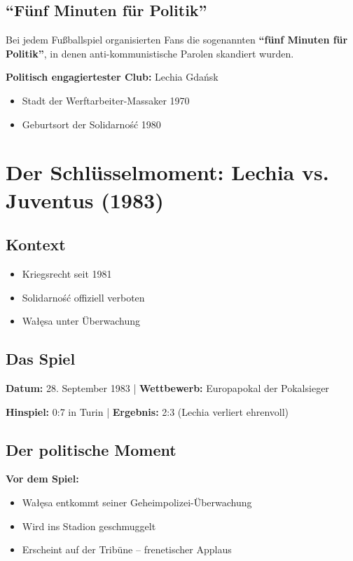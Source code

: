 \documentclass[11pt,a4paper]{book}
\newenvironment{filminfo}{%
  \begin{mdframed}[
    linecolor=darkgray,
    linewidth=1pt,
    backgroundcolor=gray!5,
    innertopmargin=10pt,
    innerbottommargin=10pt
  ]
}{%
  \end{mdframed}
}
\begin{document}
\subsection{``Fünf Minuten für Politik''}

Bei jedem Fußballspiel organisierten Fans die sogenannten \textbf{``fünf Minuten für Politik''}, in denen anti-kommunistische Parolen skandiert wurden.

\textbf{Politisch engagiertester Club:} Lechia Gdańsk
\begin{itemize}
    \item Stadt der Werftarbeiter-Massaker 1970
    \item Geburtsort der Solidarność 1980
\end{itemize}

\section{Der Schlüsselmoment: Lechia vs. Juventus (1983)}

\subsection{Kontext}

\begin{itemize}
    \item Kriegsrecht seit 1981
    \item Solidarność offiziell verboten
    \item Wałęsa unter Überwachung
\end{itemize}

\subsection{Das Spiel}

\begin{filminfo}
\textbf{Datum:} 28. September 1983 | \textbf{Wettbewerb:} Europapokal der Pokalsieger

\textbf{Hinspiel:} 0:7 in Turin | \textbf{Ergebnis:} 2:3 (Lechia verliert ehrenvoll)
\end{filminfo}

\subsection{Der politische Moment}

\textbf{Vor dem Spiel:}
\begin{itemize}
    \item Wałęsa entkommt seiner Geheimpolizei-Überwachung
    \item Wird ins Stadion geschmuggelt
    \item Erscheint auf der Tribüne -- frenetischer Applaus
\end{itemize}
\end{document}
